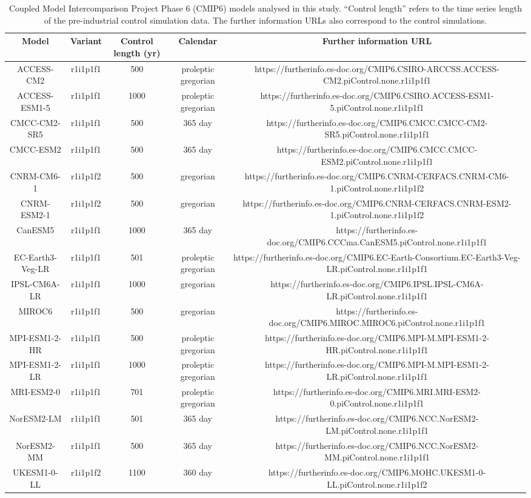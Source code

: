\begin{table*}[t]
\centering
\caption{Coupled Model Intercomparison Project Phase 6 (CMIP6) models analysed in this study. ``Control length'' refers to the time series length of the pre-industrial control simulation data. The further information URLs also correspond to the control simulations. }
\begin{tabular}{ccccc}
\toprule
Model & Variant & Control length (yr) & Calendar & Further information URL \\
\midrule
ACCESS-CM2 & r1i1p1f1 & 500 & proleptic gregorian & https://furtherinfo.es-doc.org/CMIP6.CSIRO-ARCCSS.ACCESS-CM2.piControl.none.r1i1p1f1 \\
ACCESS-ESM1-5 & r1i1p1f1 & 1000 & proleptic gregorian & https://furtherinfo.es-doc.org/CMIP6.CSIRO.ACCESS-ESM1-5.piControl.none.r1i1p1f1 \\
CMCC-CM2-SR5 & r1i1p1f1 & 500 & 365 day & https://furtherinfo.es-doc.org/CMIP6.CMCC.CMCC-CM2-SR5.piControl.none.r1i1p1f1 \\
CMCC-ESM2 & r1i1p1f1 & 500 & 365 day & https://furtherinfo.es-doc.org/CMIP6.CMCC.CMCC-ESM2.piControl.none.r1i1p1f1 \\
CNRM-CM6-1 & r1i1p1f2 & 500 & gregorian & https://furtherinfo.es-doc.org/CMIP6.CNRM-CERFACS.CNRM-CM6-1.piControl.none.r1i1p1f2 \\
CNRM-ESM2-1 & r1i1p1f2 & 500 & gregorian & https://furtherinfo.es-doc.org/CMIP6.CNRM-CERFACS.CNRM-ESM2-1.piControl.none.r1i1p1f2 \\
CanESM5 & r1i1p1f1 & 1000 & 365 day & https://furtherinfo.es-doc.org/CMIP6.CCCma.CanESM5.piControl.none.r1i1p1f1 \\
EC-Earth3-Veg-LR & r1i1p1f1 & 501 & proleptic gregorian & https://furtherinfo.es-doc.org/CMIP6.EC-Earth-Consortium.EC-Earth3-Veg-LR.piControl.none.r1i1p1f1 \\
IPSL-CM6A-LR & r1i1p1f1 & 1000 & gregorian & https://furtherinfo.es-doc.org/CMIP6.IPSL.IPSL-CM6A-LR.piControl.none.r1i1p1f1 \\
MIROC6 & r1i1p1f1 & 500 & gregorian & https://furtherinfo.es-doc.org/CMIP6.MIROC.MIROC6.piControl.none.r1i1p1f1 \\
MPI-ESM1-2-HR & r1i1p1f1 & 500 & proleptic gregorian & https://furtherinfo.es-doc.org/CMIP6.MPI-M.MPI-ESM1-2-HR.piControl.none.r1i1p1f1 \\
MPI-ESM1-2-LR & r1i1p1f1 & 1000 & proleptic gregorian & https://furtherinfo.es-doc.org/CMIP6.MPI-M.MPI-ESM1-2-LR.piControl.none.r1i1p1f1 \\
MRI-ESM2-0 & r1i1p1f1 & 701 & proleptic gregorian & https://furtherinfo.es-doc.org/CMIP6.MRI.MRI-ESM2-0.piControl.none.r1i1p1f1 \\
NorESM2-LM & r1i1p1f1 & 501 & 365 day & https://furtherinfo.es-doc.org/CMIP6.NCC.NorESM2-LM.piControl.none.r1i1p1f1 \\
NorESM2-MM & r1i1p1f1 & 500 & 365 day & https://furtherinfo.es-doc.org/CMIP6.NCC.NorESM2-MM.piControl.none.r1i1p1f1 \\
UKESM1-0-LL & r1i1p1f2 & 1100 & 360 day & https://furtherinfo.es-doc.org/CMIP6.MOHC.UKESM1-0-LL.piControl.none.r1i1p1f2 \\
\bottomrule
\end{tabular}
\end{table*}
